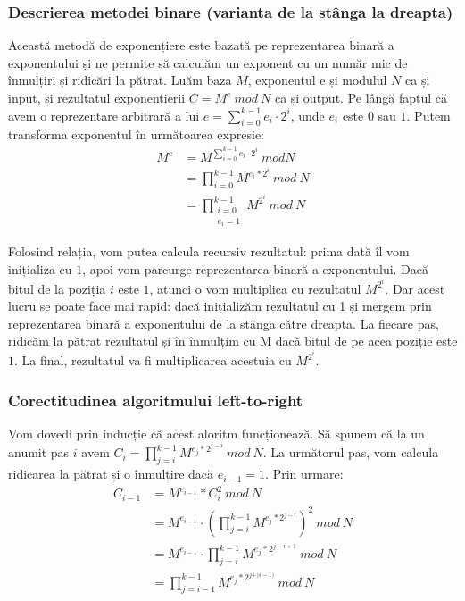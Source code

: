 \documentclass[12pt, oneside]{book}
\begin{document}
      \subsubsection{Descrierea metodei binare (varianta de la stânga la dreapta)}
       Această metodă de exponențiere este bazată pe reprezentarea binară a exponentului și ne permite să calculăm un exponent cu un număr mic de înmulțiri și ridicări la pătrat. Luăm baza $M$, exponentul e și modulul $N$ ca și input, și rezultatul exponențierii $C = M^e \ mod \ N$ ca și output. Pe lângă faptul că avem o reprezentare arbitrară a lui $ e = \sum_{i=0} ^ {k-1} e_i \cdot   2^i $, unde $ e_i $ este $0$ sau $1$. Putem transforma exponentul în următoarea expresie: \\
       \begin{align*}
        M^e &= M^{\sum_{i=0} ^ {k-1} e_i \cdot   2^i} \ mod N \\ 
        &=  \prod_{i=0}^{k-1} M^{e_i*2^i} \ mod \ N \\
        &= \prod_{\substack{i=0 \\ e_i =1}}^{k-1} M^{2^i} \ mod \ N 
       \end{align*}
        
       Folosind relația, vom putea calcula recursiv rezultatul: prima dată îl vom inițializa cu $1$, apoi vom parcurge reprezentarea binară a exponentului. Dacă bitul de la poziția $i$ este $1$, atunci o vom multiplica cu rezultatul $ M^{2^i}$. Dar acest lucru se poate face mai rapid: dacă inițializăm rezultatul cu 1 și mergem prin reprezentarea binară a exponentului de la stânga către dreapta. La fiecare pas, ridicăm la pătrat rezultatul și în înmulțim cu M dacă bitul de pe acea poziție este $1$. La final, rezultatul va fi multiplicarea acestuia cu $ M^{2^i}$.
      \subsubsection{Corectitudinea algoritmului left-to-right}
      Vom dovedi prin inducție că acest aloritm funcționează. Să spunem că la un anumit pas $i$ avem $ C_i = \prod_{j=i}^{k-1} {M^{e_j*2^{j-i}}} \ mod \ N$. La următorul pas, vom calcula ridicarea la pătrat și o înmulțire dacă $ e_{i-1} = 1 $. Prin urmare: \\
      \begin{align*}
       C_{i-1} &= M^{e_{i-1}}*C_{i}^2 \ mod \ N\\
       &= M^{e_{i-1}} \cdot   \left( \prod_{j=i}^{k-1} M^{e_j*2^{j-i}} \right)^2 \ mod \ N \\ 
       &= M^{e_{i-1}} \cdot   \prod_{j=i}^{k-1} M^{e_j*2^{j-i+1}} \ mod \ N \\
       &= \prod_{j=i-1}^{k-1} M^{e_j*2^{j+)i-1)}} \ mod \ N 
      \end{align*}
      
\end{document}
